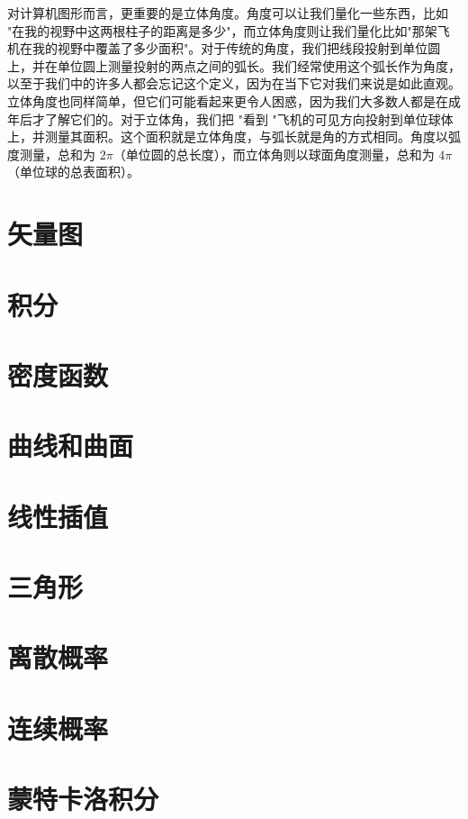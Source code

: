 \documentclass[lang=cn,12pt]{elegantbook}
\begin{document}
对计算机图形而言，更重要的是立体角度。角度可以让我们量化一些东西，比如 "在我的视野中这两根柱子的距离是多少"，而立体角度则让我们量化比如"那架飞机在我的视野中覆盖了多少面积"。对于传统的角度，我们把线段投射到单位圆上，并在单位圆上测量投射的两点之间的弧长。我们经常使用这个弧长作为角度，以至于我们中的许多人都会忘记这个定义，因为在当下它对我们来说是如此直观。立体角度也同样简单，但它们可能看起来更令人困惑，因为我们大多数人都是在成年后才了解它们的。对于立体角，我们把 "看到 "飞机的可见方向投射到单位球体上，并测量其面积。这个面积就是立体角度，与弧长就是角的方式相同。角度以弧度测量，总和为 $2\pi$（单位圆的总长度），而立体角则以球面角度测量，总和为 $4\pi$（单位球的总表面积）。

\section{矢量图}

\section{积分}

\section{密度函数}

\section{曲线和曲面}

\section{线性插值}

\section{三角形}

\section{离散概率}

\section{连续概率}

\section{蒙特卡洛积分}
\end{document}
